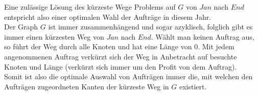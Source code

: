 \documentclass[12pt, a4paper]{article}
\begin{document}
Eine zulässige Lösung des kürzeste Wege Problems auf $G$ von $Jan$ nach $End$ entspricht also einer optimalen Wahl der Aufträge in diesem Jahr.\\
Der Graph $G$ ist immer zusammenhängend und sogar azyklisch, folglich gibt es immer einen kürzesten Weg von $Jan$ nach $End$. Wählt man keinen Auftrag aus, so führt der Weg durch alle Knoten und hat eine Länge von $0$. Mit jedem angenommenen Auftrag verkürzt sich der Weg in Anbetracht auf besuchte Knoten und Länge (verkürzt sich immer um den Profit von dem Auftrag).\\

Somit ist also die optimale Auswahl von Aufträgen immer die, mit welchen den Aufträgen zugeordneten Kanten der kürzeste Weg in $G$ existiert.
\end{document}
